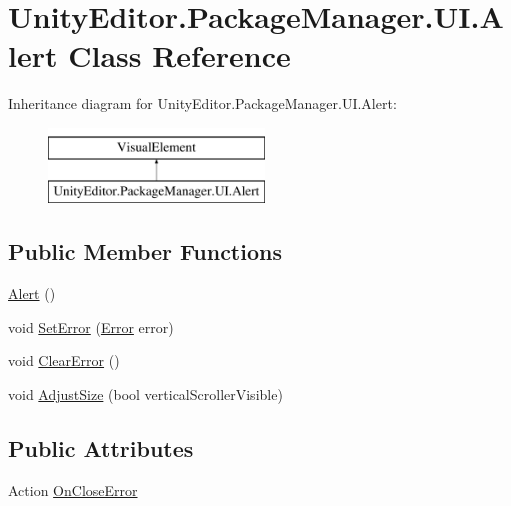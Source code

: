 \hypertarget{class_unity_editor_1_1_package_manager_1_1_u_i_1_1_alert}{}\section{Unity\+Editor.\+Package\+Manager.\+U\+I.\+Alert Class Reference}
\label{class_unity_editor_1_1_package_manager_1_1_u_i_1_1_alert}
Inheritance diagram for Unity\+Editor.\+Package\+Manager.\+U\+I.\+Alert\+:\begin{figure}[H]
\begin{center}
\leavevmode
\includegraphics[height=2.000000cm]{class_unity_editor_1_1_package_manager_1_1_u_i_1_1_alert}
\end{center}
\end{figure}
\subsection*{Public Member Functions}
\begin{DoxyCompactItemize}
\item 
\mbox{\hyperlink{class_unity_editor_1_1_package_manager_1_1_u_i_1_1_alert_a98a897e72d9a172a974610963a989589}{Alert}} ()
\item 
void \mbox{\hyperlink{class_unity_editor_1_1_package_manager_1_1_u_i_1_1_alert_a80d12e442a9ac9d3f56375b958a26b95}{Set\+Error}} (\mbox{\hyperlink{namespace_unity_editor_1_1_package_manager_1_1_u_i_ab1815eb3e48074893d9dc1dc99a4a32aa902b0d55fddef6f8d651fe1035b7d4bd}{Error}} error)
\item 
void \mbox{\hyperlink{class_unity_editor_1_1_package_manager_1_1_u_i_1_1_alert_aa8a6fa9c50616c19e66e00e80c20f7a3}{Clear\+Error}} ()
\item 
void \mbox{\hyperlink{class_unity_editor_1_1_package_manager_1_1_u_i_1_1_alert_adefee73ba0a86c091a7325b8abc033a1}{Adjust\+Size}} (bool vertical\+Scroller\+Visible)
\end{DoxyCompactItemize}
\subsection*{Public Attributes}
\begin{DoxyCompactItemize}
\item 
Action \mbox{\hyperlink{class_unity_editor_1_1_package_manager_1_1_u_i_1_1_alert_ae4a831caf5805a238a76496fdbcc8644}{On\+Close\+Error}}
\end{DoxyCompactItemize}


